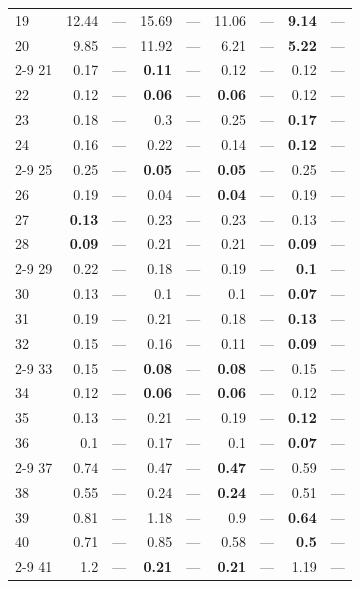\begin{longtable}{lr@{\hskip 4pt}l@{\hskip 12pt}r@{\hskip 4pt}l@{\hskip 12pt}r@{\hskip 4pt}l@{\hskip 12pt}r@{\hskip 4pt}l@{\hskip 12pt}}
19 & 12.44 & --- & 15.69 & --- & 11.06 & --- & \textbf{9.14} & --- \\
20 & 9.85 & --- & 11.92 & --- & 6.21 & --- & \textbf{5.22} & --- \\
\cmidrule{2-9}
21 & 0.17 & --- & \textbf{0.11} & --- & 0.12 & --- & 0.12 & --- \\
22 & 0.12 & --- & \textbf{0.06} & --- & \textbf{0.06} & --- & 0.12 & --- \\
23 & 0.18 & --- & 0.3 & --- & 0.25 & --- & \textbf{0.17} & --- \\
24 & 0.16 & --- & 0.22 & --- & 0.14 & --- & \textbf{0.12} & --- \\
\cmidrule{2-9}
25 & 0.25 & --- & \textbf{0.05} & --- & \textbf{0.05} & --- & 0.25 & --- \\
26 & 0.19 & --- & 0.04 & --- & \textbf{0.04} & --- & 0.19 & --- \\
27 & \textbf{0.13} & --- & 0.23 & --- & 0.23 & --- & 0.13 & --- \\
28 & \textbf{0.09} & --- & 0.21 & --- & 0.21 & --- & \textbf{0.09} & --- \\
\cmidrule{2-9}
29 & 0.22 & --- & 0.18 & --- & 0.19 & --- & \textbf{0.1} & --- \\
30 & 0.13 & --- & 0.1 & --- & 0.1 & --- & \textbf{0.07} & --- \\
31 & 0.19 & --- & 0.21 & --- & 0.18 & --- & \textbf{0.13} & --- \\
32 & 0.15 & --- & 0.16 & --- & 0.11 & --- & \textbf{0.09} & --- \\
\cmidrule{2-9}
33 & 0.15 & --- & \textbf{0.08} & --- & \textbf{0.08} & --- & 0.15 & --- \\
34 & 0.12 & --- & \textbf{0.06} & --- & \textbf{0.06} & --- & 0.12 & --- \\
35 & 0.13 & --- & 0.21 & --- & 0.19 & --- & \textbf{0.12} & --- \\
36 & 0.1 & --- & 0.17 & --- & 0.1 & --- & \textbf{0.07} & --- \\
\cmidrule{2-9}
37 & 0.74 & --- & 0.47 & --- & \textbf{0.47} & --- & 0.59 & --- \\
38 & 0.55 & --- & 0.24 & --- & \textbf{0.24} & --- & 0.51 & --- \\
39 & 0.81 & --- & 1.18 & --- & 0.9 & --- & \textbf{0.64} & --- \\
40 & 0.71 & --- & 0.85 & --- & 0.58 & --- & \textbf{0.5} & --- \\
\cmidrule{2-9}
41 & 1.2 & --- & \textbf{0.21} & --- & \textbf{0.21} & --- & 1.19 & --- \\

\end{longtable}

